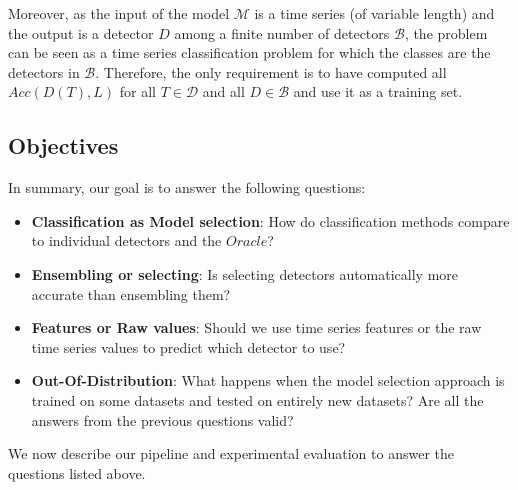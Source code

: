 Moreover, as the input of the model $\mathcal{M}$ is a time series (of variable length) and the output is a detector $D$ among a finite number of detectors $\mathcal{B}$, the problem can be seen as a time series classification problem for which the classes are the detectors in $\mathcal{B}$. Therefore, the only requirement is to have computed all $Acc(D(T),L)$ for all $T\in \mathcal{D}$ and all $D\in \mathcal{B}$ and use it as a training set.

\subsection{Objectives}
\label{sec:objective}

In summary, our goal is to answer the following questions:
\begin{itemize}%
	\item \textbf{Classification as Model selection}: How do classification methods compare to individual detectors and the $Oracle$?
	\item \textbf{Ensembling or selecting}: Is selecting detectors automatically more accurate than ensembling them?
	\item \textbf{Features or Raw values}: Should we use time series features or the raw time series values to predict which detector to use?
	\item \textbf{Out-Of-Distribution}: What happens when the model selection approach is trained on some datasets and tested on entirely new datasets? Are all the answers from the previous questions valid? 
\end{itemize}

\noindent We now describe our pipeline and experimental evaluation to answer the questions listed above. 